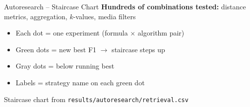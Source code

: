 \documentclass[aspectratio=169]{beamer}
\begin{document}
\begin{frame}{Autoresearch -- Staircase Chart}
  \centering
  \textbf{Hundreds of combinations tested:} distance metrics, aggregation, $k$-values, media filters

  \vspace{0.5em}
  \begin{itemize}
    \item Each dot = one experiment (formula $\times$ algorithm pair)
    \item Green dots = new best F1 $\rightarrow$ staircase steps up
    \item Gray dots = below running best
    \item Labels = strategy name on each green dot
  \end{itemize}
  \vspace{0.5em}

  {\small Staircase chart from \texttt{results/autoresearch/retrieval.csv}}
\end{frame}
\end{document}
